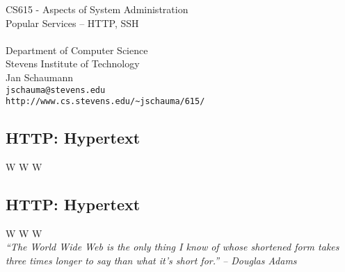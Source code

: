 \documentclass[xga]{xdvislides}
\begin{document}
\setfontphv

\lhead{\slidetitle}                               %
\cfoot{\relax}                               %
\rfoot{\Gray{\today}}

\vspace*{\fill}
\begin{center}
	\Hugesize
		CS615 - Aspects of System Administration\\ [1em]
		Popular Services -- HTTP, SSH\\ [1em]
	\hspace*{5mm}\blueline\\ [1em]
	\Normalsize
		Department of Computer Science\\
		Stevens Institute of Technology\\
		Jan Schaumann\\
		\verb+jschauma@stevens.edu+\\
		\verb+http://www.cs.stevens.edu/~jschauma/615/+
\end{center}
\vspace*{\fill}


\subsection{HTTP: Hypertext}
\vspace{.5in}
\begin{center}
	\Huge
	W W W
\end{center}
\Normalsize

\subsection{HTTP: Hypertext}
\vspace{.5in}
\begin{center}
	\Huge
	W W W
	\\
\vspace{.5in}
	{\em ``The World Wide Web is the only thing I know of whose shortened form
	takes three times longer to say than what it's short for.'' -- Douglas Adams}
\end{center}
\Normalsize
\end{document}
